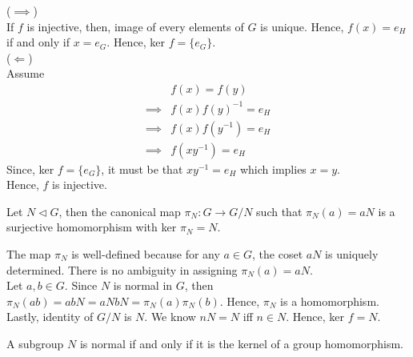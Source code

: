 \begin{lemmaproof}
    ($\implies$)\\
    If $f$ is injective, then, image of every elements of $G$ is unique. Hence, $f(x) = e_H$ if and only if $x = e_G$. Hence, ker $f = \{e_G\}$.\\
    ($\Leftarrow$)\\
    Assume \begin{align*}
        &f(x) = f(y)\\
        \implies & f(x) f(y)^{-1} = e_H\\
        \implies & f(x) f(y^{-1}) = e_H\\
        \implies & f(xy^{-1}) = e_H
    \end{align*}
    Since, ker $f = \{e_G\}$, it must be that $xy^{-1} = e_H$ which implies $x=y$.\\
    Hence, $f$ is injective.
\end{lemmaproof}
\begin{lemma}
    Let $N \lhd G$, then the canonical map $\pi_N: G \rightarrow G/N$ such that $\pi_N(a) = aN$ is a surjective homomorphism with ker $\pi_N = N$.
\end{lemma}
\begin{lemmaproof}
    The map $\pi_N$ is well-defined because for any $a \in G$, the coset $aN$ is uniquely determined. There is no ambiguity in assigning $\pi_N(a) = aN$.\\
    Let $a, b \in G$. Since $N$ is normal in $G$, then $\pi_N(ab) = abN = aN bN = \pi_N(a)\pi_N(b)$. Hence, $\pi_N$ is a homomorphism.\\
    Lastly, identity of $G/N$ is $N$. We know $nN = N$ iff $n\in N$. Hence, ker $f = N$.
\end{lemmaproof}
\begin{corollary}
    A subgroup $N$ is normal if and only if it is the kernel of a group homomorphism.
\end{corollary}